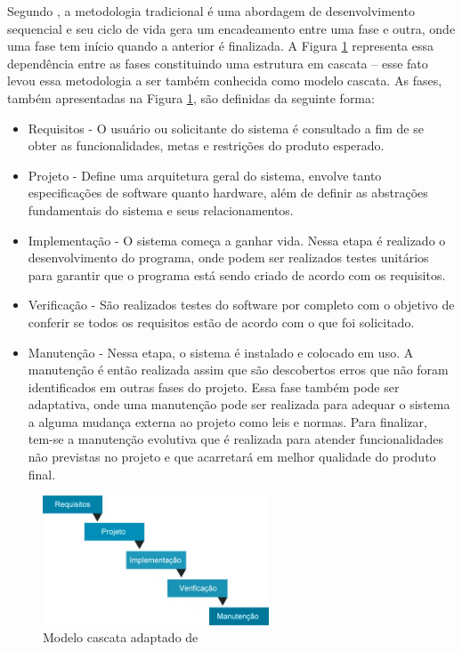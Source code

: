 \documentclass[quali]{ppgccufscar}
\begin{document}
Segundo , a metodologia tradicional é uma abordagem de desenvolvimento sequencial e seu ciclo de vida gera um encadeamento entre uma fase e outra, onde uma fase tem início quando a anterior é finalizada.  A Figura \ref{fig_cascata} representa essa dependência entre as fases constituindo uma estrutura em cascata -- esse fato levou essa metodologia a ser também conhecida como modelo cascata. As fases, também apresentadas na Figura \ref{fig_cascata}, são definidas da seguinte forma: 

\begin{itemize}
	\item Requisitos - O usuário ou solicitante do sistema é consultado a fim de se obter as funcionalidades, metas e restrições do produto esperado.
	\item Projeto - Define uma arquitetura geral do sistema, envolve tanto especificações de software quanto hardware, além de definir as abstrações fundamentais do sistema e seus relacionamentos.
	\item Implementação - O sistema começa a ganhar vida. Nessa etapa é realizado o desenvolvimento do programa, onde podem ser realizados testes unitários para garantir que o programa está sendo criado de acordo com os requisitos.
	\item Verificação - São realizados testes do software por completo com o objetivo de conferir se todos os requisitos estão de acordo com o que foi solicitado.
	\item Manutenção - Nessa etapa, o sistema é instalado e colocado em uso. A manutenção é então realizada assim que são descobertos erros que não foram identificados em outras fases do projeto. Essa fase também pode ser adaptativa, onde uma manutenção pode ser realizada para adequar o sistema a alguma mudança externa ao projeto como leis e normas. Para finalizar, tem-se a manutenção evolutiva que é realizada para atender funcionalidades não previstas no projeto e que acarretará em melhor qualidade do produto final.
\end{itemize}

\begin{figure}[!htbp]
	\begin{center}
	\caption{Modelo cascata adaptado de }
	\label{fig_cascata}
	\includegraphics[width=0.6\textwidth,natwidth=598,natheight=342]{figura2.jpg}
	\end{center}
\end{figure}
\end{document}
